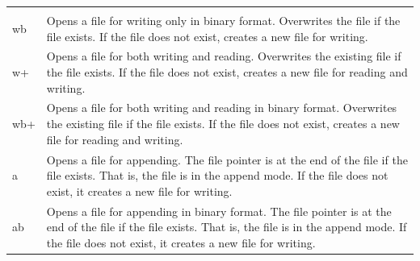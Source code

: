 \documentclass[11pt]{article}
\begin{document}
\begin{longtable}[]{@{}ll@{}}
\begin{minipage}[t]{0.91\columnwidth}
\end{minipage}\tabularnewline
\begin{minipage}[t]{0.03\columnwidth}\raggedright\strut
wb\strut
\end{minipage} & \begin{minipage}[t]{0.91\columnwidth}\raggedright\strut
Opens a file for writing only in binary format. Overwrites the file if
the file exists. If the file does not exist, creates a new file for
writing.\strut
\end{minipage}\tabularnewline
\begin{minipage}[t]{0.03\columnwidth}\raggedright\strut
w+\strut
\end{minipage} & \begin{minipage}[t]{0.91\columnwidth}\raggedright\strut
Opens a file for both writing and reading. Overwrites the existing file
if the file exists. If the file does not exist, creates a new file for
reading and writing.\strut
\end{minipage}\tabularnewline
\begin{minipage}[t]{0.03\columnwidth}\raggedright\strut
wb+\strut
\end{minipage} & \begin{minipage}[t]{0.91\columnwidth}\raggedright\strut
Opens a file for both writing and reading in binary format. Overwrites
the existing file if the file exists. If the file does not exist,
creates a new file for reading and writing.\strut
\end{minipage}\tabularnewline
\begin{minipage}[t]{0.03\columnwidth}\raggedright\strut
a\strut
\end{minipage} & \begin{minipage}[t]{0.91\columnwidth}\raggedright\strut
Opens a file for appending. The file pointer is at the end of the file
if the file exists. That is, the file is in the append mode. If the file
does not exist, it creates a new file for writing.\strut
\end{minipage}\tabularnewline
\begin{minipage}[t]{0.03\columnwidth}\raggedright\strut
ab\strut
\end{minipage} & \begin{minipage}[t]{0.91\columnwidth}\raggedright\strut
Opens a file for appending in binary format. The file pointer is at the
end of the file if the file exists. That is, the file is in the append
mode. If the file does not exist, it creates a new file for
writing.\strut
\end{minipage}\tabularnewline

\end{longtable}
\end{document}

